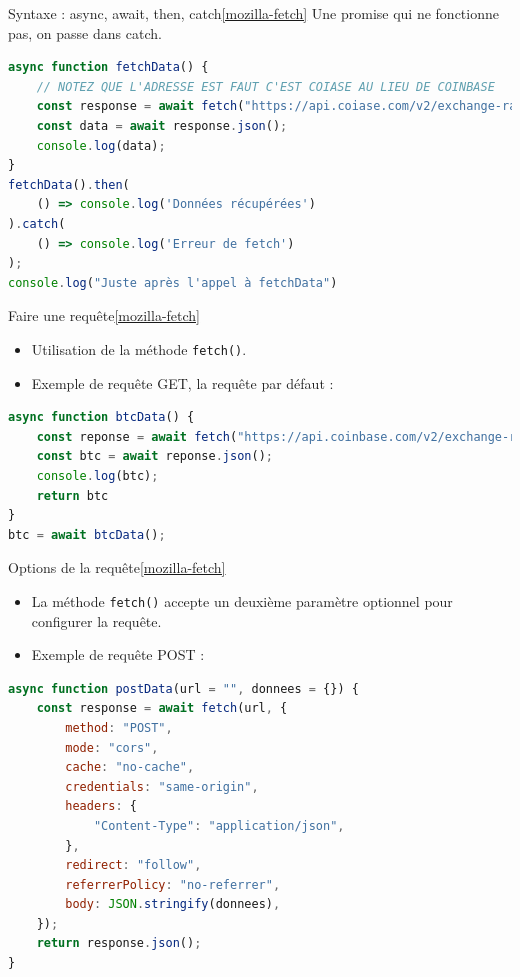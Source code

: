 \documentclass{beamer}
\begin{document}
    \begin{frame}[fragile]{Syntaxe : async, await, then, catch\cref{mozilla-fetch}}
        Une promise qui ne fonctionne pas, on passe dans catch.
        \begin{lstlisting}[language=JavaScript,title={\tiny{Script JavaScript}}]
async function fetchData() {
    // NOTEZ QUE L'ADRESSE EST FAUT C'EST COIASE AU LIEU DE COINBASE
    const response = await fetch("https://api.coiase.com/v2/exchange-rates?currency=BTC");
    const data = await response.json();
    console.log(data);
}
fetchData().then(
    () => console.log('Données récupérées')
).catch(
    () => console.log('Erreur de fetch')
);
console.log("Juste après l'appel à fetchData")
        \end{lstlisting}
    \end{frame}

    \begin{frame}[fragile]{Faire une requête\cref{mozilla-fetch}}
        \begin{itemize}
            \item Utilisation de la méthode \lstinline{fetch()}.
            \item Exemple de requête GET, la requête par défaut :
        \end{itemize}
        \begin{lstlisting}[language=JavaScript,title={\tiny{Script JavaScript}}]
async function btcData() {
    const reponse = await fetch("https://api.coinbase.com/v2/exchange-rates?currency=BTC");
    const btc = await reponse.json();
    console.log(btc);
    return btc
}
btc = await btcData();
        \end{lstlisting}
    \end{frame}

    \begin{frame}[fragile]{Options de la requête\cref{mozilla-fetch}}
        \begin{itemize}
            \item La méthode \lstinline{fetch()} accepte un deuxième paramètre optionnel pour configurer la requête.
            \item Exemple de requête POST :
        \end{itemize}
        \begin{lstlisting}[language=JavaScript,title={\tiny{Script JavaScript}}]
async function postData(url = "", donnees = {}) {
    const response = await fetch(url, {
        method: "POST",
        mode: "cors",
        cache: "no-cache",
        credentials: "same-origin",
        headers: {
            "Content-Type": "application/json",
        },
        redirect: "follow",
        referrerPolicy: "no-referrer",
        body: JSON.stringify(donnees),
    });
    return response.json();
}
        \end{lstlisting}
    \end{frame}
\end{document}
